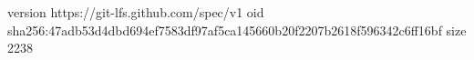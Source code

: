 version https://git-lfs.github.com/spec/v1
oid sha256:47adb53d4dbd694ef7583df97af5ca145660b20f2207b2618f596342c6ff16bf
size 2238
